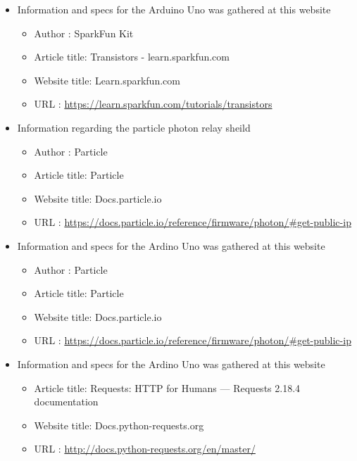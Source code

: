 \documentclass{article}
\begin{document}
\begin{thebibliography}{56}
    \begin{itemize}
        \item Information and specs for the Arduino Uno was gathered at this website
        \begin{itemize}
            \item Author       : SparkFun Kit
            \item Article title: Transistors - learn.sparkfun.com
            \item Website title: Learn.sparkfun.com
            \item URL          : \url{https://learn.sparkfun.com/tutorials/transistors}
        \end{itemize}
    \end{itemize}

    \begin{itemize}
        \item Information regarding the particle photon relay sheild
        \begin{itemize}
            \item Author       : Particle
            \item Article title: Particle
            \item Website title: Docs.particle.io
            \item URL          : \url{https://docs.particle.io/reference/firmware/photon/#get-public-ip}
        \end{itemize}
    \end{itemize}

    \begin{itemize}
        \item Information and specs for the Ardino Uno was gathered at this website
        \begin{itemize}
            \item Author       : Particle
            \item Article title: Particle
            \item Website title: Docs.particle.io
            \item URL          : \url{https://docs.particle.io/reference/firmware/photon/#get-public-ip}
        \end{itemize}
    \end{itemize}

    \begin{itemize}
        \item Information and specs for the Ardino Uno was gathered at this website
        \begin{itemize}
            \item Article title: Requests: HTTP for Humans — Requests 2.18.4 documentation
            \item Website title: Docs.python-requests.org
            \item URL          : \url{http://docs.python-requests.org/en/master/}
        \end{itemize}
    \end{itemize}
\end{thebibliography}
\end{document}
